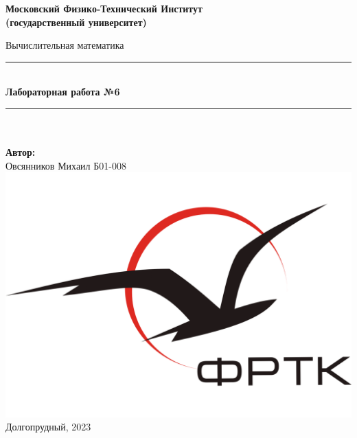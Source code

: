 \newcommand{\HRule}{\rule{\linewidth}{0.7mm}} %

\begin{center}
	\large\textbf{Московский Физико-Технический Институт}\\
	\large\textbf{(государственный университет)}
	
	\vfill
	

	
	\Large Вычислительная математика
	
	\HRule
	\\[0.4cm]
	{ \huge \bfseries Лабораторная работа №6}
	\\[0.4cm] %
	\HRule
	\\[0.5cm]
	
	\ \\
	\textbf{\large Автор:} \\	
	\large Овсянников Михаил Б01-008\\
	\vfill
	\hspace*{-0.8 cm}\includegraphics[width=100 pt]{./Include/frkt_logo.pdf}\\
	\large Долгопрудный, 2023
\end{center}

\thispagestyle{empty}

\newpage
\setcounter{page}{2}
\fancyfoot[c]{\thepage}
\fancyhead[R]{}
